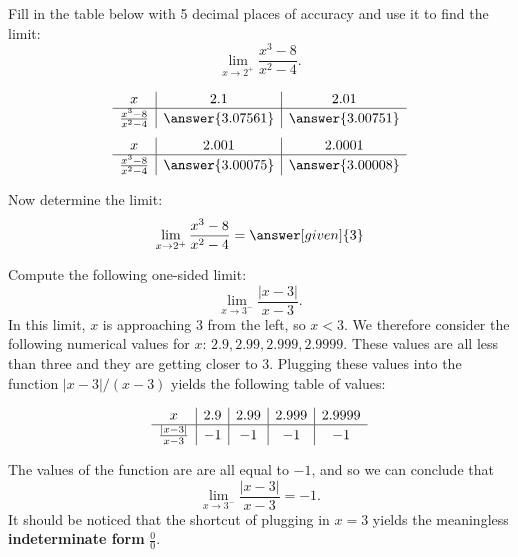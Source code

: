 \documentclass{ximera}
\begin{document}
\begin{problem}[problem 2]
Fill in the table below with 5 decimal places of accuracy and use it to find the limit:
\[\lim_{x \to 2^+} \frac{x^3 - 8}{x^2 - 4}.\]

\begin{prompt}
\begin{center}
\[
\begin{array}{ c | c | c }
  x & 2.1 & 2.01   \\ 
	\hline 
	 \frac{x^3 - 8}{x^2 - 4} & \answer{3.07561} & \answer{3.00751} 
\end{array}
\]
\[
\begin{array}{ c | c | c  }
  x  & 2.001 & 2.0001 \\ 
	\hline 
	 \frac{x^3 - 8}{x^2 - 4}  & \answer{3.00075} & \answer{3.00008}
\end{array}
\]
\end{center}
Now determine the limit:
\[
\lim_{x \to 2^+} \frac{x^3 - 8}{x^2 - 4} = \answer[given]{3}
\]
\end{prompt}
\end{problem}


\begin{example}[example 3]
Compute the following one-sided limit: 
\[\lim_{x \to 3^{-}} \frac{|x-3|}{x-3}.\]
In this limit, $x$ is approaching $3$ from the left, so $x<3$. 
We therefore consider the following numerical values for $x$: $2.9, 2.99, 2.999, 2.9999$.
These values are all less than three and they are getting closer to $3$.
Plugging these values into the function $|x-3|/(x-3)$ yields the
following table of values: 

  
\[
\begin{array}{ c | c | c | c | c }
  x & 2.9 & 2.99 & 2.999 & 2.9999 \\ 
	\hline
	 \frac{|x-3|}{x-3} & -1 & -1 & -1 & -1  
\end{array}
\]

The values of the function are are all equal to $-1$, 
and so we can conclude that 
\[\lim_{x \to 3^{-}} \frac{|x-3|}{x-3} = -1.\]
It should be noticed that the shortcut of plugging in $x=3$ yields the 
meaningless \textbf{indeterminate form} $\frac00$.\\
\end{example}
\end{document}
